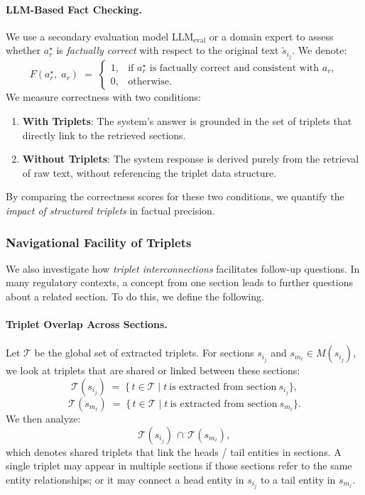 \documentclass{article}
\begin{document}
\paragraph{LLM-Based Fact Checking.}
We use a secondary evaluation model \(\mathrm{LLM}_{\text{eval}}\) or a domain expert to assess whether \(a_r^\star\) is \emph{factually correct} with respect to the original text \(\widetilde{s}_{i_j}\). We denote:
\[
F(a_r^\star,\; a_r) \;=\;
\begin{cases}
1, & \text{if $a_r^\star$ is factually correct and consistent with $a_r$}, \\
0, & \text{otherwise}.
\end{cases}
\]
We measure correctness with two conditions:
\begin{enumerate}
\item \textbf{With Triplets}: The system’s answer is grounded in the set of triplets that directly link to the retrieved sections.
\item \textbf{Without Triplets}: The system response is derived purely from the retrieval of raw text, without referencing the triplet data structure.
\end{enumerate}
By comparing the correctness scores for these two conditions, we quantify the \emph{impact of structured triplets} in factual precision.

\subsubsection{Navigational Facility of Triplets}

We also investigate how \emph{triplet interconnections} facilitates follow-up questions. In many regulatory contexts, a concept from one section leads to further questions about a related section. To do this, we define the following.

\paragraph{Triplet Overlap Across Sections.}
Let \(\mathcal{T}\) be the global set of extracted triplets. For sections \(s_{i_j}\) and \(s_{m_\ell}\in M(s_{i_j})\), we look at triplets that are shared or linked between these sections:
\[
\mathcal{T}(s_{i_j}) \;=\; \{\, t\in \mathcal{T}\mid t\ \text{is extracted from section}\ s_{i_j}\},
\]
\[
\mathcal{T}(s_{m_\ell}) \;=\; \{\, t\in \mathcal{T}\mid t\ \text{is extracted from section}\ s_{m_\ell}\}.
\]
We then analyze:
\[
\mathcal{T}(s_{i_j}) \,\cap\, \mathcal{T}(s_{m_\ell}),
\]
which denotes shared triplets that link the heads / tail entities in sections. A single triplet may appear in multiple sections if those sections refer to the same entity relationships; or it may connect a head entity in \(s_{i_j}\) to a tail entity in \(s_{m_\ell}\).
\end{document}
